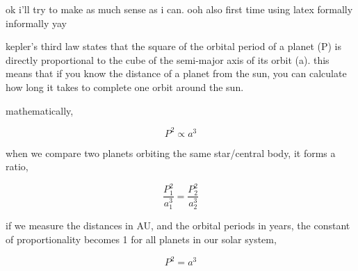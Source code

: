 \documentclass{article}
\begin{document}
ok i'll try to make as much sense as i can. ooh also first time using latex formally informally yay
\bigskip

kepler's third law states that the square of the orbital period of a planet (P) is directly proportional to the cube of the semi-major axis of its orbit (a). this means that if you know the distance of a planet from the sun, you can calculate how long it takes to complete one orbit around the sun.
\smallskip

mathematically,

\begin{equation}
P^2 \propto a^3
\end{equation}

when we compare two planets orbiting the same star/central body, it forms a ratio,

\begin{equation}
\frac{P_1^2}{a_1^3} = \frac{P_2^2}{a_2^3}
\end{equation}

if we measure the distances in AU, and the orbital periods in years, the constant of proportionality becomes 1 for all planets in our solar system,

\begin{equation}
P^2 = a^3
\end{equation}
\end{document}
